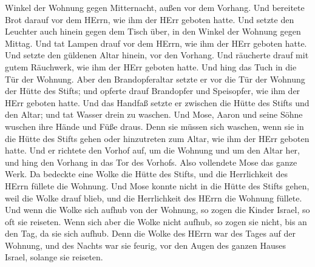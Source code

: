 Winkel der Wohnung gegen Mitternacht, außen vor dem Vorhang.
 Und bereitete Brot darauf vor dem HErrn, wie ihm der HErr
geboten hatte.  Und setzte den Leuchter auch hinein gegen
dem Tisch über, in den Winkel der Wohnung gegen Mittag. 
Und tat Lampen drauf vor dem HErrn, wie ihm der HErr geboten hatte.
 Und setzte den güldenen Altar hinein, vor den Vorhang.
 Und räucherte drauf mit gutem Räuchwerk, wie ihm der HErr
geboten hatte.  Und hing das Tuch in die Tür der Wohnung.
 Aber den Brandopferaltar setzte er vor die Tür der Wohnung
der Hütte des Stifts; und opferte drauf Brandopfer und Speisopfer, wie
ihm der HErr geboten hatte.  Und das Handfaß setzte er
zwischen die Hütte des Stifts und den Altar; und tat Wasser drein zu
waschen.  Und Mose, Aaron und seine Söhne wuschen ihre
Hände und Füße draus.  Denn sie müssen sich waschen, wenn
sie in die Hütte des Stifts gehen oder hinzutreten zum Altar, wie ihm
der HErr geboten hatte.  Und er richtete den Vorhof auf, um
die Wohnung und um den Altar her, und hing den Vorhang in das Tor des
Vorhofs. Also vollendete Mose das ganze Werk.  Da bedeckte
eine Wolke die Hütte des Stifts, und die Herrlichkeit des HErrn füllete
die Wohnung.  Und Mose konnte nicht in die Hütte des Stifts
gehen, weil die Wolke drauf blieb, und die Herrlichkeit des HErrn die
Wohnung füllete.  Und wenn die Wolke sich aufhub von der
Wohnung, so zogen die Kinder Israel, so oft sie reiseten. 
Wenn sich aber die Wolke nicht aufhub, so zogen sie nicht, bis an den
Tag, da sie sich aufhub.  Denn die Wolke des HErrn war des
Tages auf der Wohnung, und des Nachts war sie feurig, vor den Augen des
ganzen Hauses Israel, solange sie reiseten.
